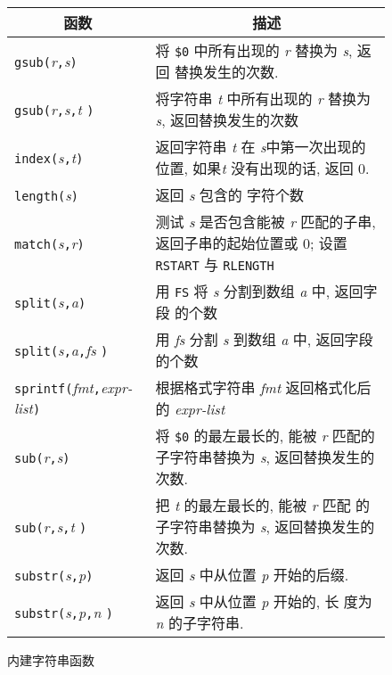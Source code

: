 \begin{figure}[ht]
    \captionsetup{type=table}
    \caption{内建字符串函数}
    \label{tbl:built_in_string_functions}
    \begin{center}
        \begin{tabular}{l|p{25em}}
            \hline
            \hline
            \multicolumn{1}{c|}{函数}    & \multicolumn{1}{c}{描述}  \\
            \hline
            \verb'gsub('\textit{r}\verb','\textit{s}\verb')' &  将
            \verb'$0' 中所有出现的 \textit{r} 替换为 \textit{s}, 返回
            替换发生的次数. \\
            \verb'gsub('\textit{r}\verb','\textit{s}\verb','\textit{t}
            \verb')'    & 将字符串 \textit{t} 中所有出现的 \textit{r}
            替换为 \textit{s}, 返回替换发生的次数 \\
            \verb'index('\textit{s}\verb','\textit{t}\verb')' & 返回字符串
            \textit{t} 在 \textit{s}中第一次出现的位置, 如果\textit{t}
            没有出现的话, 返回 0.   \\
            \verb'length('\textit{s}\verb')'    & 返回 \textit{s} 包含的
            字符个数 \\
            \verb'match('\textit{s}\verb','\textit{r}\verb')'   &
            测试 \textit{s} 是否包含能被 \textit{r} 匹配的子串,
            返回子串的起始位置或
            0; 设置 \verb'RSTART' 与 \verb'RLENGTH' \\
            \verb'split('\textit{s}\verb','\textit{a}\verb')'   &
            用 \verb'FS' 将 \textit{s} 分割到数组 \textit{a} 中, 返回字段
            的个数  \\
            \verb'split('\textit{s}\verb','\textit{a}\verb','\textit{fs}%
            \verb')'    & 用 \textit{fs} 分割 \textit{s} 到数组 \textit{a}
            中, 返回字段的个数  \\
            \verb'sprintf('\textit{fmt}\verb','\textit{expr-list}\verb')'
            & 根据格式字符串 \textit{fmt} 返回格式化后的 \textit{expr-list}
            \\
            \verb'sub('\textit{r}\verb','\textit{s}\verb')' &
            将 \verb'$0' 的最左最长的, 能被 \textit{r} 匹配的子字符串替换为
            \textit{s}, 返回替换发生的次数. \\
            \verb'sub('\textit{r}\verb','\textit{s}\verb','\textit{t}%
            \verb')'    & 把 \textit{t} 的最左最长的, 能被 \textit{r} 匹配
            的子字符串替换为 \textit{s}, 返回替换发生的次数.    \\
            \verb'substr('\textit{s}\verb','\textit{p}\verb')'  &
            返回 \textit{s} 中从位置 \textit{p} 开始的后缀.\\
            \verb'substr('\textit{s}\verb','\textit{p}\verb','\textit{n}%
            \verb')'    & 返回 \textit{s} 中从位置 \textit{p} 开始的, 长
            度为 \textit{n} 的子字符串. \\
            \hline
        \end{tabular}
    \end{center}
\end{figure}

